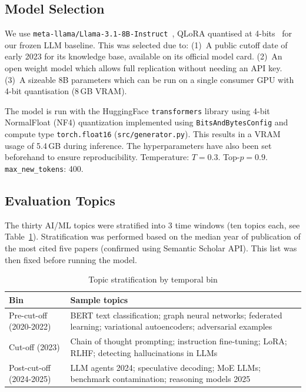 \documentclass[conference]{IEEEtran}
\begin{document}
\subsection{Model Selection}
\label{sec:model}

We use \texttt{meta-llama/Llama-3.1-8B-Instruct}~\cite{llama3}, QLoRA quantised at 4-bits~\cite{dettmers2023}
for our frozen LLM baseline. This was selected due to:
(1)~A public cutoff date of early 2023 for its knowledge base, available
on its official model card.
(2)~An open weight model which allows full replication without needing
an API key.
(3)~A sizeable 8B parameters which can be run on a single consumer
GPU with 4-bit quantisation (8\,GB VRAM).

The model is run with the HuggingFace \texttt{transformers} library using 4-bit
NormalFloat (NF4) quantization implemented using \texttt{BitsAndBytesConfig} and compute
type \texttt{torch.float16} (\texttt{src/generator.py}). This results in a VRAM usage of
5.4\,GB during inference. The hyperparameters have also been
set beforehand to ensure reproducibility. Temperature: $T = 0.3$. Top-$p = 0.9$.
\texttt{max\_new\_tokens}: 400.

\subsection{Evaluation Topics}
\label{sec:topics}

The thirty AI/ML topics were stratified into 3 time windows (ten topics each,
see Table~\ref{tab:topics}). Stratification was performed based on the median
year of publication of the most cited five papers (confirmed using Semantic
Scholar API). This list was then fixed before running the model.

\begin{table}[htbp]
\caption{Topic stratification by temporal bin}
\label{tab:topics}
\centering\small
\begin{tabular}{p{2.0cm}p{5.0cm}}
\toprule
\textbf{Bin} & \textbf{Sample topics} \\
\midrule
Pre-cut-off \newline (2020-2022)
& BERT text classification; graph neural networks; federated learning;
variational autoencoders; adversarial examples \\[2pt]
Cut-off \newline (2023)
& Chain of thought prompting; instruction fine-tuning; LoRA; RLHF;
detecting hallucinations in LLMs \\[2pt]
Post-cut-off \newline (2024-2025)
& LLM agents 2024; speculative decoding; MoE LLMs; benchmark
contamination; reasoning models 2025 \\
\bottomrule
\end{tabular}
\end{table}
\end{document}
